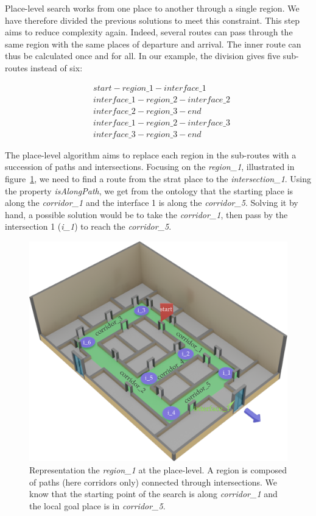 Place-level search works from one place to another through a single region. We have therefore divided the previous solutions to meet this constraint. This step aims to reduce complexity again. Indeed, several routes can pass through the same region with the same places of departure and arrival. The inner route can thus be calculated once and for all. In our example, the division gives five sub-routes instead of six:

\begin{align*}
&start - region\_1 - interface\_1 \\
&interface\_1 - region\_2 - interface\_2 \\
&interface\_2 - region\_3 - end \\
&interface\_1 - region\_2 - interface\_3 \\
&interface\_3 - region\_3 - end
\end{align*}

The place-level algorithm aims to replace each region in the sub-routes with a succession of paths and intersections. Focusing on the \textit{region\_1}, illustrated in figure~\ref{fig:chap3_region1}, we need to find a route from the strat place to the \textit{intersection\_1}. Using the property \textit{isAlongPath}, we get from the ontology that the starting place is along the \textit{corridor\_1} and the interface 1 is along the \textit{corridor\_5}. Solving it by hand, a possible solution would be to take the \textit{corridor\_1}, then pass by the intersection 1 (\textit{i\_1}) to reach the \textit{corridor\_5}.

\begin{figure}[ht!]
\centering
\includegraphics[scale=0.28]{figures/chapter3/region1.png}
\caption{\label{fig:chap3_region1} Representation the \textit{region\_1} at the place-level. A region is composed of paths (here corridors only) connected through intersections. We know that the starting point of the search is along \textit{corridor\_1} and the local goal place is in \textit{corridor\_5}. }
\end{figure}


